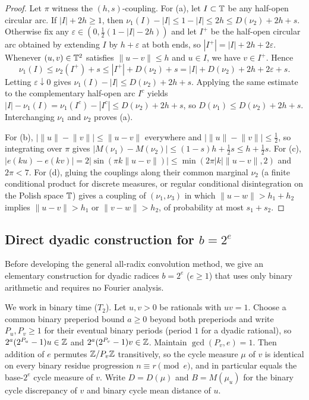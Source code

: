 \documentclass[11pt]{article}
\newcommand{\dist}[1]{\lVert #1\rVert}
\begin{document}
\begin{proof}
Let $\pi$ witness the $(h,s)$-coupling. For (a), let $I\subset\mathbb T$ be any half-open circular arc. If $|I|+2h\ge1$, then $\nu_1(I)-|I|\le 1-|I|\le 2h\le D(\nu_2)+2h+s$. Otherwise fix any $\varepsilon\in(0,\frac12(1-|I|-2h))$ and let $I^+$ be the half-open circular arc obtained by extending $I$ by $h+\varepsilon$ at both ends, so $|I^+|=|I|+2h+2\varepsilon$. Whenever $(u,v)\in\mathbb T^2$ satisfies $\dist{u-v}\le h$ and $u\in I$, we have $v\in I^+$. Hence
\[
\nu_1(I)\le \nu_2(I^+)+s\le |I^+|+D(\nu_2)+s=|I|+D(\nu_2)+2h+2\varepsilon+s.
\]
Letting $\varepsilon\downarrow0$ gives $\nu_1(I)-|I|\le D(\nu_2)+2h+s$. Applying the same estimate to the complementary half-open arc $I^c$ yields $|I|-\nu_1(I)=\nu_1(I^c)-|I^c|\le D(\nu_2)+2h+s$, so $D(\nu_1)\le D(\nu_2)+2h+s$. Interchanging $\nu_1$ and $\nu_2$ proves (a).

For (b), $|\dist{u}-\dist{v}|\le\dist{u-v}$ everywhere and $|\dist{u}-\dist{v}|\le\frac12$, so integrating over $\pi$ gives $|M(\nu_1)-M(\nu_2)|\le (1-s)h+\frac12 s\le h+\frac12 s$. For (c), $|e(ku)-e(kv)|=2|\sin(\pi k\dist{u-v})|\le\min(2\pi|k|\dist{u-v},2)$ and $2\pi<7$. For (d), gluing the couplings along their common marginal $\nu_2$ (a finite conditional product for discrete measures, or regular conditional disintegration on the Polish space $\mathbb T$) gives a coupling of $(\nu_1,\nu_3)$ in which $\dist{u-w}>h_1+h_2$ implies $\dist{u-v}>h_1$ or $\dist{v-w}>h_2$, of probability at most $s_1+s_2$.
\end{proof}

\subsection{Direct dyadic construction for \texorpdfstring{$b=2^e$}{dyadic radices}}

Before developing the general all-radix convolution method, we give an elementary construction for dyadic radices $b=2^e$ ($e\ge1$) that uses only binary arithmetic and requires no Fourier analysis.

We work in binary time ($T_2$). Let $u,v>0$ be rationals with $uv=1$. Choose a common binary preperiod bound $a\ge0$ beyond both preperiods and write $P_u,P_v\ge1$ for their eventual binary periods (period $1$ for a dyadic rational), so $2^a(2^{P_u}-1)u\in\mathbb Z$ and $2^a(2^{P_v}-1)v\in\mathbb Z$. Maintain $\gcd(P_v,e)=1$. Then addition of $e$ permutes $\mathbb Z/P_v\mathbb Z$ transitively, so the cycle measure $\mu$ of $v$ is identical on every binary residue progression $n\equiv r\pmod e$, and in particular equals the base-$2^e$ cycle measure of $v$. Write $D=D(\mu)$ and $B=M(\mu_u)$ for the binary cycle discrepancy of $v$ and binary cycle mean distance of $u$.
\end{document}
